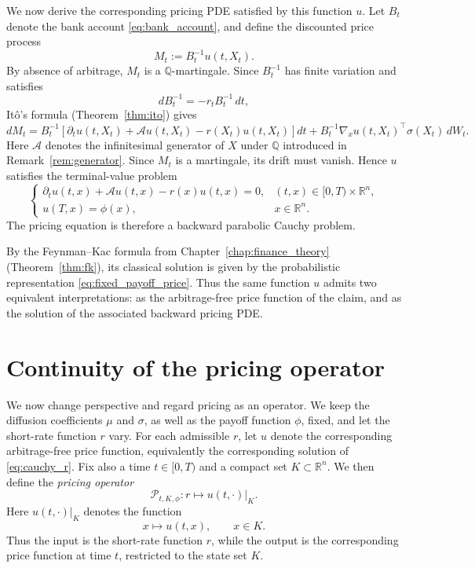 We now derive the corresponding pricing PDE satisfied by this function $u$. Let $B_t$ denote the bank account \eqref{eq:bank_account}, and define the discounted price process
\[
    M_t := B_t^{-1}u(t,X_t).
\]
By absence of arbitrage, $M_t$ is a $\mathbb{Q}$-martingale. Since $B_t^{-1}$ has finite variation and satisfies
\[
    dB_t^{-1} = -r_t B_t^{-1}\,dt,
\]
It\^o's formula (Theorem~\ref{thm:ito}) gives
\begin{equation}
    dM_t
    =
    B_t^{-1}\!\left[
        \partial_t u(t,X_t)
        + \mathcal{A}u(t,X_t)
        - r(X_t)u(t,X_t)
    \right]dt
    +
    B_t^{-1}\nabla_x u(t,X_t)^{\!\top}\sigma(X_t)\,dW_t.
\label{eq:dM}
\end{equation}
Here $\mathcal{A}$ denotes the infinitesimal generator of $X$ under $\mathbb{Q}$ introduced in Remark~\ref{rem:generator}. Since $M_t$ is a martingale, its drift must vanish. Hence $u$ satisfies the terminal-value problem
\begin{equation}
\begin{cases}
    \partial_t u(t,x) + \mathcal{A}u(t,x) - r(x)u(t,x) = 0,
    & (t,x)\in[0,T)\times\mathbb{R}^n, \\[4pt]
    u(T,x)=\phi(x),
    & x\in\mathbb{R}^n.
\end{cases}
\label{eq:cauchy_r}
\end{equation}
The pricing equation is therefore a backward parabolic Cauchy problem.

By the Feynman--Kac formula from Chapter~\ref{chap:finance_theory} (Theorem~\ref{thm:fk}), its classical solution is given by the probabilistic representation \eqref{eq:fixed_payoff_price}. Thus the same function \(u\) admits two equivalent interpretations: as the arbitrage-free price function of the claim, and as the solution of the associated backward pricing PDE.

\section{Continuity of the pricing operator}
\label{sec:continuity}

We now change perspective and regard pricing as an operator. We keep the diffusion coefficients $\mu$ and $\sigma$, as well as the payoff function $\phi$, fixed, and let the short-rate function $r$ vary. For each admissible $r$, let $u$ denote the corresponding arbitrage-free price function, equivalently the corresponding solution of \eqref{eq:cauchy_r}. Fix also a time $t \in [0,T)$ and a compact set $K \subset \mathbb{R}^n$. We then define the \emph{pricing operator}
\begin{equation}
    \mathcal{P}_{t,K,\phi} : r \longmapsto u(t,\cdot)\big|_K.
\label{eq:pricing_operator}
\end{equation}
Here $u(t,\cdot)|_K$ denotes the function
\[
    x \mapsto u(t,x), \qquad x \in K.
\]
Thus the input is the short-rate function $r$, while the output is the corresponding price function at time $t$, restricted to the state set $K$.

